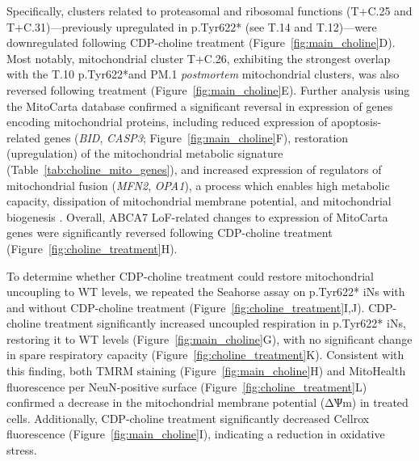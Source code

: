 Specifically, clusters related to proteasomal and ribosomal functions (T+C.25 and T+C.31)—previously upregulated in p.Tyr622* (see T.14 and T.12)—were downregulated following CDP-choline treatment (Figure~\ref{fig:main_choline}D). Most notably, mitochondrial cluster T+C.26, exhibiting the strongest overlap with the T.10 p.Tyr622*and PM.1 \textit{postmortem} mitochondrial clusters, was also reversed following treatment (Figure~\ref{fig:main_choline}E). Further analysis using the MitoCarta database confirmed a significant reversal in expression of genes encoding mitochondrial proteins, including reduced expression of apoptosis-related genes (\textit{BID}, \textit{CASP3}; Figure~\ref{fig:main_choline}F), restoration (upregulation) of the mitochondrial metabolic signature (Table~\ref{tab:choline_mito_genes}), and increased expression of regulators of mitochondrial fusion (\textit{MFN2}, \textit{OPA1}), a process which enables high metabolic capacity, dissipation of mitochondrial membrane potential, and mitochondrial biogenesis \cite{Westermann2010-au}. Overall, ABCA7 LoF-related changes to expression of MitoCarta genes were significantly reversed following CDP-choline treatment (Figure~\ref{fig:choline_treatment}H). 

To determine whether CDP-choline treatment could restore mitochondrial uncoupling to WT levels, we repeated the Seahorse assay on p.Tyr622* iNs with and without CDP-choline treatment (Figure~\ref{fig:choline_treatment}I,J). CDP-choline treatment significantly increased uncoupled respiration in p.Tyr622* iNs, restoring it to WT levels (Figure~\ref{fig:main_choline}G), with no significant change in spare respiratory capacity (Figure~\ref{fig:choline_treatment}K). Consistent with this finding, both TMRM staining (Figure~\ref{fig:main_choline}H) and MitoHealth fluorescence per NeuN-positive surface (Figure~\ref{fig:choline_treatment}L) confirmed a decrease in the mitochondrial membrane potential (ΔѰm) in treated cells. Additionally, CDP-choline treatment significantly decreased Cellrox fluorescence (Figure~\ref{fig:main_choline}I), indicating a reduction in oxidative stress. 

